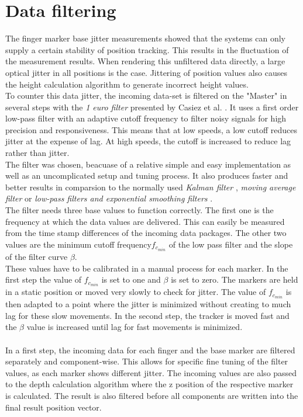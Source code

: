 \section{Data filtering}
The finger marker base jitter measurements showed that the systems can only supply a certain stability of position tracking. This results in the fluctuation of the measurement results. When rendering this unfiltered data directly, a large optical jitter in all positions is the case. Jittering of position values also causes the height calculation algorithm to generate incorrect height values.\\
To counter this data jitter, the incoming data-set is filtered on the "Master" in several steps with the \textit{1 euro filter} presented by Casiez et al. \cite{Casiez.2012}. It uses a first order low-pass filter with an adaptive cutoff frequency to filter noisy signals for high precision and responsiveness. This means that at low speeds, a low cutoff reduces jitter at the expense of lag. At high speeds, the cutoff is increased to reduce lag rather than jitter.\\
The filter was chosen, beacuase of a relative simple and easy implementation as well as an uncomplicated setup and tuning process. It also produces faster and better results in comparsion to the normally used \textit{Kalman filter} \cite{Welch.2001}, \textit{moving average filter} or \textit{low-pass filters and exponential smoothing filters} \cite{LaViola.2003}.\\ The filter needs three base values to function correctly. The first one is the frequency at which the data values are delivered. This can easily be measured from the time stamp differences of the incoming data packages. The other two values are the minimum cutoff frequency$f_{c_{min}} $ of the low pass filter and the slope of the filter curve $\beta$.
\\These values have to be calibrated in a manual process for each marker. In the first step the value of $f_{c_{min}} $ is set to one and $\beta$ is set to zero. The markers are held in a static position or moved very slowly to check for jitter. The value of $f_{c_{min}} $ is then adapted to a point where the jitter is minimized without creating to much lag for these slow movements. In the second step, the tracker is moved fast and the $\beta$ value is increased until lag for fast movements is minimized.
\\\\ In a first step, the incoming data for each finger and the base marker are filtered separately and component-wise. This allows for specific fine tuning of the filter values, as each marker shows different jitter. The incoming values are also passed to the depth calculation algorithm where the z position of the respective marker is calculated. The result is also filtered before all components are written into the final result position vector.
\newpage
